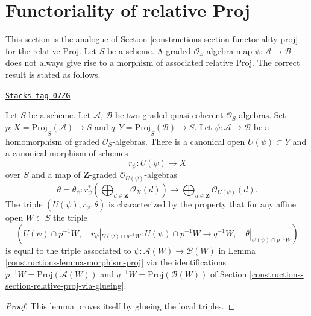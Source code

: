 \section{Functoriality of relative Proj}
\label{constructions-section-functoriality-relative-proj}
This section is the analogue of Section \ref{constructions-section-functoriality-proj}
for the relative Proj. Let $S$ be a scheme. A graded $\mathcal{O}_S$-algebra
map $\psi : \mathcal{A} \to \mathcal{B}$ does not always give rise to a
morphism of associated relative Proj. The correct result is stated as follows.

\begin{lemma}
\label{constructions-lemma-morphism-relative-proj}
\href{https://stacks.math.columbia.edu/tag/07ZG}{\texttt{Stacks tag 07ZG}}

Let $S$ be a scheme. Let $\mathcal{A}$, $\mathcal{B}$ be two graded
quasi-coherent $\mathcal{O}_S$-algebras. Set
$p : X = \underline{\text{Proj}}_S(\mathcal{A}) \to S$ and
$q : Y = \underline{\text{Proj}}_S(\mathcal{B}) \to S$. Let
$\psi : \mathcal{A} \to \mathcal{B}$ be a homomorphism of
graded $\mathcal{O}_S$-algebras. There is a canonical open
$U(\psi) \subset Y$ and a canonical morphism of schemes
$$
r_\psi :
U(\psi)
\longrightarrow
X
$$
over $S$ and a map of $\mathbf{Z}$-graded $\mathcal{O}_{U(\psi)}$-algebras
$$
\theta = \theta_\psi :
r_\psi^*\left(
\bigoplus\nolimits_{d \in \mathbf{Z}} \mathcal{O}_X(d)
\right)
\longrightarrow
\bigoplus\nolimits_{d \in \mathbf{Z}} \mathcal{O}_{U(\psi)}(d).
$$
The triple $(U(\psi), r_\psi, \theta)$ is characterized by the property
that for any affine open $W \subset S$ the triple
$$
(U(\psi) \cap p^{-1}W,\quad
r_\psi|_{U(\psi) \cap p^{-1}W} : U(\psi) \cap p^{-1}W \to q^{-1}W,\quad
\theta|_{U(\psi) \cap p^{-1}W})
$$
is equal to the triple associated to
$\psi : \mathcal{A}(W) \to \mathcal{B}(W)$ in
Lemma \ref{constructions-lemma-morphism-proj} via the identifications
$p^{-1}W = \text{Proj}(\mathcal{A}(W))$ and
$q^{-1}W = \text{Proj}(\mathcal{B}(W))$ of
Section \ref{constructions-section-relative-proj-via-glueing}.
\end{lemma}

\begin{proof}
This lemma proves itself by glueing the local triples.
\end{proof}

